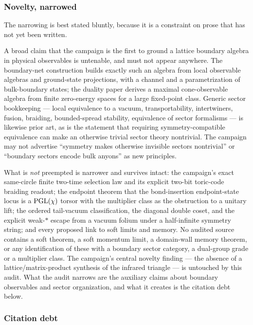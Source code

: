 \subsubsection*{Novelty, narrowed}

The narrowing is best stated bluntly, because it is a constraint on prose that
has not yet been written.

A broad claim that the campaign is the first to ground a lattice boundary
algebra in physical observables is untenable, and must not appear anywhere. The
boundary-net construction builds exactly such an algebra from local observable
algebras and ground-state projections, with a channel and a parametrization of
bulk-boundary states; the duality paper derives a maximal cone-observable
algebra from finite zero-energy spaces for a large fixed-point class. Generic
sector bookkeeping --- local equivalence to a vacuum, transportability,
intertwiners, fusion, braiding, bounded-spread stability, equivalence of sector
formalisms --- is likewise prior art, as is the statement that requiring
symmetry-compatible equivalence can make an otherwise trivial sector theory
nontrivial. The campaign may not advertise ``symmetry makes otherwise invisible
sectors nontrivial'' or ``boundary sectors encode bulk anyons'' as new
principles.

What is \emph{not} preempted is narrower and survives intact: the campaign's
exact same-circle finite two-time selection law and its explicit two-bit
toric-code braiding readout; the endpoint theorem that the bond-insertion
endpoint-state locus is a $\mathrm{PGL}(\chi)$ torsor with the multiplier class as the
obstruction to a unitary lift; the ordered tail-vacuum classification, the
diagonal double coset, and the explicit weak-$*$ escape from a vacuum folium
under a half-infinite symmetry string; and every proposed link to soft limits
and memory. No audited source contains a soft theorem, a soft momentum limit,
a domain-wall memory theorem, or any identification of these with a boundary
sector category, a dual-group grade or a multiplier class. The campaign's
central novelty finding --- the absence of a lattice/matrix-product synthesis
of the infrared triangle --- is untouched by this audit. What the audit narrows
are the auxiliary claims about boundary observables and sector organization,
and what it creates is the citation debt below.

\subsubsection*{Citation debt}

